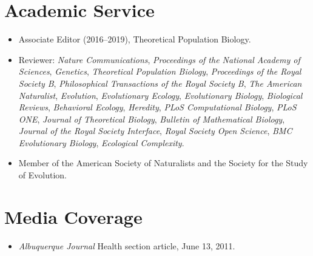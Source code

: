 \documentclass[11pt]{article}
\begin{document}

  \section{Academic Service}
  \begin{itemize}
    \item Associate Editor (2016--2019), Theoretical Population Biology.
    \item Reviewer: \textit{Nature Communications}, \textit{Proceedings of the National Academy of Sciences}, \textit{Genetics}, \textit{Theoretical Population Biology}, \textit{Proceedings of the Royal Society B}, \textit{Philosophical Transactions of the Royal Society B}, \textit{The American Naturalist}, \textit{Evolution}, \textit{Evolutionary Ecology}, \textit{Evolutionary Biology}, \textit{Biological Reviews}, \textit{Behavioral Ecology}, \textit{Heredity}, \textit{PLoS Computational Biology}, \textit{PLoS ONE}, \textit{Journal of Theoretical Biology}, \textit{Bulletin of Mathematical Biology}, \textit{Journal of the Royal Society Interface}, \textit{Royal Society Open Science}, \textit{BMC Evolutionary Biology}, \textit{Ecological Complexity}.
  \item Member of the American Society of Naturalists and the Society for the Study of Evolution.
  \end{itemize}
  

  \section{Media Coverage}
  \begin{itemize}
  \item \textit{Albuquerque Journal} Health section article, June 13, 2011.
  \end{itemize}


  \pagestyle{fancy}
\end{document}
